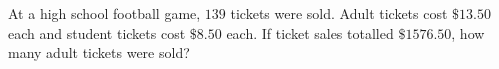 At a high school football game, $139$ tickets were sold. Adult tickets cost $\$13.50$ each and student tickets cost $\$8.50$ each. If ticket sales totalled $\$1576.50$, how many adult tickets were sold?

